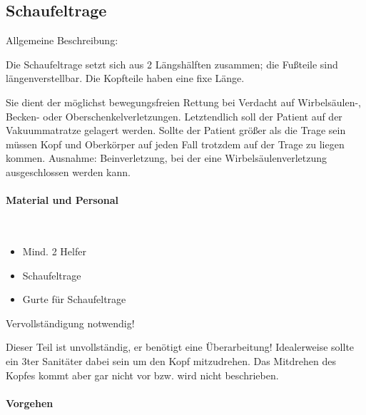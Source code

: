 \subsection{Schaufeltrage}
\label{topic:schaufeltrage-handhabung}

Allgemeine
Beschreibung: 

Die Schaufeltrage setzt sich aus 2 Längshälften zusammen;
die Fußteile sind längenverstellbar. Die Kopfteile haben eine fixe Länge.

Sie dient der möglichst bewegungsfreien Rettung bei Verdacht
auf Wirbelsäulen-, Becken- oder Oberschenkelverletzungen. Letztendlich soll
der Patient auf der Vakuummatratze gelagert werden. Sollte der Patient größer
als die Trage sein müssen Kopf und Oberkörper auf jeden Fall
trotzdem auf der Trage zu liegen kommen. Ausnahme: Beinverletzung, bei
der eine Wirbelsäulenverletzung ausgeschlossen werden kann.


\paragraph*{Material und Personal}~

\begin{itemize}
    \item Mind. 2 Helfer
    \item Schaufeltrage
    \item Gurte für Schaufeltrage
\end{itemize}


{Vervollständigung notwendig! \par Dieser Teil ist unvollständig, 
   er benötigt eine Überarbeitung!    
   Idealerweise sollte ein 3ter Sanitäter dabei sein um den Kopf mitzudrehen.
   Das Mitdrehen des Kopfes kommt aber gar nicht vor bzw. wird nicht
   beschrieben. }

\paragraph*{Vorgehen}~

